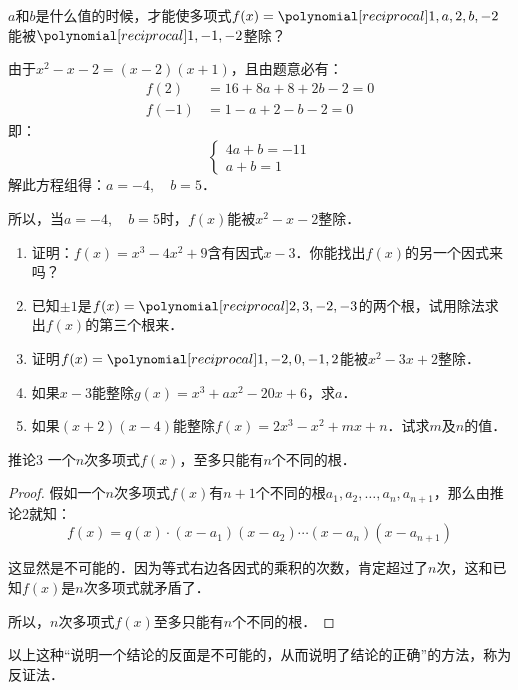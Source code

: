 \begin{example}
    $a$和$b$是什么值的时候，才能使多项式$f(x)=\poly{1,a,2,b,-2}$能被$\poly{1,-1,-2}$整除？
\end{example}

\begin{solution}
由于$x^2-x-2=(x-2)(x+1)$，且由题意必有：
\[\begin{split}
    f(2) &= 16+8a+8+2b-2=0\\
    f(-1)&=1-a+2-b-2=0
\end{split}\]
即：\[\begin{cases}
    4a+b=-11\\
    a+b=1
\end{cases}\]
解此方程组得：$a=-4,\quad b=5$．

所以，当$a=-4,\quad b=5$时，$f(x)$能被$x^2-x-2$整除．
\end{solution}

\begin{ex}
\begin{enumerate}
    \item 证明：$f(x)=x^3-4x^2+9$含有因式$x-3$．你能找出$f(x)$的另一个因式来吗？
    \item 已知$\pm 1$是$f(x)=\poly{2,3,-2,-3}$的两个根，试用除法求出$f(x)$的第三个根来．
    \item 证明$f(x)=\poly{1,-2,0,-1,2}$能被$x^2-3x+2$整除．
    \item 如果$x-3$能整除$g(x)=x^3+ax^2-20x+6$，求$a$．
    \item 如果$(x+2)(x-4)$能整除$f(x)=2x^3-x^2+mx+n$．试求$m$及$n$的值．
\end{enumerate}
\end{ex}

\begin{blk}{推论3}
    一个$n$次多项式$f(x)$，至多只能有$n$个不同的根．
\end{blk}

\begin{proof}
假如一个$n$次多项式$f(x)$有$n+1$个不同的根$a_1,a_2,\ldots,a_n,a_{n+1}$，那么由推论2就知：
\[f (x) =q (x) \cdot  (x-a_1) (x-a_2)\cdots (x-a_n)(x-a_{n+1})\] 

这显然是不可能的．因为等式右边各因式的乘积的次数，肯定超过了$n$次，这和已知$f(x)$是$n$次多项式就矛盾了．

所以，$n$次多项式$f(x)$至多只能有$n$个不同的根．
\end{proof}

以上这种“说明一个结论的反面是不可能的，从而说明了结论的正确”的方法，称为反证法．


